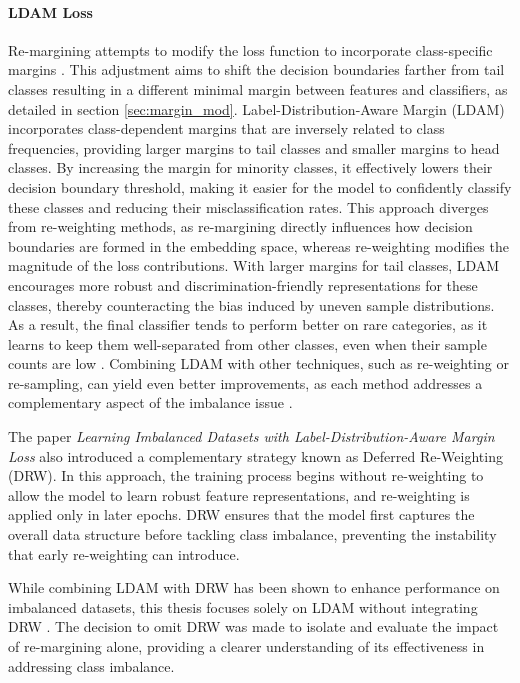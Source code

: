 \paragraph{LDAM Loss}
Re-margining attempts to modify the loss function to incorporate class-specific margins \cite{zhang2023deep}. This adjustment aims to shift the decision boundaries farther from tail classes resulting in a different minimal margin between features and classifiers, as detailed in section \ref{sec:margin_mod}. Label-Distribution-Aware Margin (LDAM) \cite{cao2019learningimbalanceddatasetslabeldistributionaware} incorporates class-dependent margins that are inversely related to class frequencies, providing larger margins to tail classes and smaller margins to head classes. By increasing the margin for minority classes, it effectively lowers their decision boundary threshold, making it easier for the model to confidently classify these classes and reducing their misclassification rates. This approach diverges from re-weighting methods, as re-margining directly influences how decision boundaries are formed in the embedding space, whereas re-weighting modifies the magnitude of the loss contributions. With larger margins for tail classes, LDAM encourages more robust and discrimination-friendly representations for these classes, thereby counteracting the bias induced by uneven sample distributions. As a result, the final classifier tends to perform better on rare categories, as it learns to keep them well-separated from other classes, even when their sample counts are low \cite{cao2019learningimbalanceddatasetslabeldistributionaware}. Combining LDAM with other techniques, such as re-weighting or re-sampling, can yield even better improvements, as each method addresses a complementary aspect of the imbalance issue \cite{cao2019learningimbalanceddatasetslabeldistributionaware}. 

The paper \emph{Learning Imbalanced Datasets with Label-Distribution-Aware Margin Loss} also introduced a complementary strategy known as Deferred Re-Weighting (DRW). In this approach, the training process begins without re-weighting to allow the model to learn robust feature representations, and re-weighting is applied only in later epochs. DRW ensures that the model first captures the overall data structure before tackling class imbalance, preventing the instability that early re-weighting can introduce.

While combining LDAM with DRW has been shown to enhance performance on imbalanced datasets, this thesis focuses solely on LDAM without integrating DRW \cite{cao2019learningimbalanceddatasetslabeldistributionaware}. The decision to omit DRW was made to isolate and evaluate the impact of re-margining alone, providing a clearer understanding of its effectiveness in addressing class imbalance.

